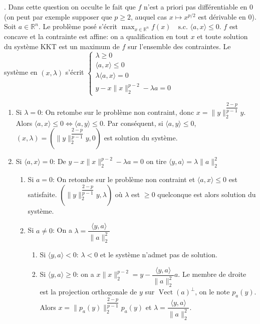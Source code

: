 \documentclass{fancybook}
\DeclareMathOperator{\Vect}{Vect}
\begin{document}
. Dans cette question on occulte le fait que $f$ n'est a priori pas différentiable en $0$ (on peut par exemple supposer que $p\geq 2$, auquel cas $x\mapsto x^{p/2}$ est dérivable en $0$).\newline
Soit $a\in \mathbb R^n$. Le problème posé s'écrit $\max_{x\in \mathbb R^n} f(x) \quad \text{s.c. } \langle a,x\rangle \leq 0$.\newline
\newline 
$f$ est concave et la contrainte est affine: on a qualification en tout $x$ et toute solution du système KKT est un maximum de $f$ sur l'ensemble des contraintes. Le système en $(x,\lambda)$ s'écrit $\begin{cases}
\lambda \geq 0 \\
\langle a,x \rangle \leq 0 \\
\lambda \langle a,x \rangle =0 \\
y-x \|x\|_2^{p-2} - \lambda a =0
\end{cases}$\newline
\begin{enumerate}
\item Si $\lambda =0$:\newline
On retombe sur le problème non contraint, donc $x=\|y\|_2^{\dfrac{2-p}{p-1}}y$.\newline
Alors $\langle a,x \rangle \leq 0 \iff \langle a,y \rangle \leq 0$. Par conséquent, si $\langle a,y \rangle \leq 0$,\newline  $(x,\lambda)=(\|y\|_2^{\dfrac{2-p}{p-1}}y,0)$ est solution du système. \newline
\item Si $\langle a,x\rangle =0$: \newline
De $y-x \|x\|_2^{p-2} - \lambda a =0$ on tire $\langle y,a \rangle = \lambda \|a\|_2^2$
\begin{enumerate}
\item Si $a=0$: On retombe sur le problème non contraint et $\langle a,x \rangle \leq 0$ est satisfaite. $(\|y\|_2^{\dfrac{2-p}{p-1}}y,\lambda)$ où $\lambda$ est $\geq 0$ quelconque est alors solution du système. \newline
\item Si $a\neq 0$: On a $\lambda =  \dfrac{\langle y,a \rangle}{\|a\|_2^2} $
\begin{enumerate}
\item Si $\langle y,a \rangle<0$: $\lambda <0$ et le système n'admet pas de solution.
\item Si $\langle y,a \rangle\geq 0$: on a $x\|x\|_2^{p-2} = y -\dfrac{\langle y,a \rangle}{\|a\|_2^2} a $. Le membre de droite est la projection orthogonale de $y$ sur $\Vect(a)^\bot$, on le note $p_a(y)$.\newline
Alors $x=\|p_a(y)\|_2^{\dfrac{2-p}{p-1}} p_a(y)$ et $\lambda =  \dfrac{\langle y,a \rangle}{\|a\|_2^2} $.
\end{enumerate}
\end{enumerate}
\end{enumerate}
\end{document}
